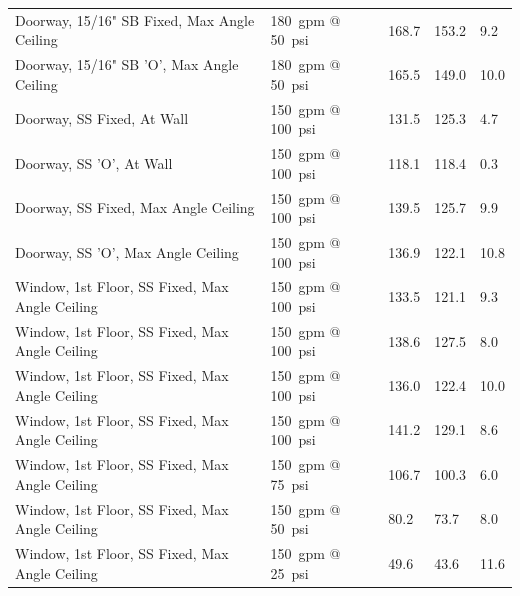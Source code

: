 \documentclass[12pt,oneside]{book}
\begin{document}
\begin{table}[!ht]
\begin{tabular}{lllll}
Doorway, 15/16" SB Fixed, Max Angle Ceiling      		 & 180~gpm @ 50~psi               & 168.7                             & 153.2                              & 9.2                    \\
Doorway, 15/16" SB 'O', Max Angle Ceiling        		 & 180~gpm @ 50~psi               & 165.5                             & 149.0                              & 10.0                   \\
Doorway, SS Fixed, At Wall                       		 & 150~gpm @ 100~psi              & 131.5                             & 125.3                              & 4.7                    \\
Doorway, SS 'O', At Wall                         		 & 150~gpm @ 100~psi              & 118.1                             & 118.4                              & 0.3                    \\
Doorway, SS Fixed, Max Angle Ceiling             		 & 150~gpm @ 100~psi              & 139.5                             & 125.7                              & 9.9                    \\
Doorway, SS 'O', Max Angle Ceiling               		 & 150~gpm @ 100~psi              & 136.9                             & 122.1                              & 10.8                   \\
Window, 1st Floor, SS Fixed, Max Angle Ceiling           & 150~gpm @ 100~psi              & 133.5                             & 121.1                              & 9.3                    \\
Window, 1st Floor, SS Fixed, Max Angle Ceiling           & 150~gpm @ 100~psi              & 138.6                             & 127.5                              & 8.0                    \\
Window, 1st Floor, SS Fixed, Max Angle Ceiling           & 150~gpm @ 100~psi              & 136.0                             & 122.4                              & 10.0                   \\
Window, 1st Floor, SS Fixed, Max Angle Ceiling           & 150~gpm @ 100~psi              & 141.2                             & 129.1                              & 8.6                    \\
Window, 1st Floor, SS Fixed, Max Angle Ceiling           & 150~gpm @ 75~psi               & 106.7                             & 100.3                              & 6.0                    \\
Window, 1st Floor, SS Fixed, Max Angle Ceiling           & 150~gpm @ 50~psi               &  80.2                             & 73.7                               & 8.0                    \\
Window, 1st Floor, SS Fixed, Max Angle Ceiling           & 150~gpm @ 25~psi               &  49.6                             & 43.6                               & 11.6                   \\                   
\bottomrule[1.25pt]
\end{tabular}
\end{table}
\end{document}
